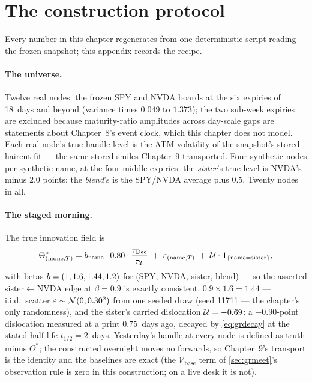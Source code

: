 \section{The construction protocol}
\label{app:grprotocol}

Every number in this chapter regenerates from one deterministic script
reading the frozen snapshot; this appendix records the recipe.

\paragraph{The universe.}
Twelve real nodes: the frozen SPY and NVDA boards at the six expiries
of 18~days and beyond (variance times $0.049$ to $1.373$); the two
sub-week expiries are excluded because maturity-ratio amplitudes
across day-scale gaps are statements about Chapter~8's event clock,
which this chapter does not model.  Each real node's true handle level
is the ATM volatility of the snapshot's stored haircut fit --- the
same stored smiles Chapter~9 transported.  Four synthetic nodes per
synthetic name, at the four middle expiries: the \emph{sister}'s true
level is NVDA's minus $2.0$ points; the \emph{blend}'s is the
SPY/NVDA average plus $0.5$.  Twenty nodes in all.

\paragraph{The staged morning.}
The true innovation field is
\[
\Theta^{*}_{(\text{name},T)}
=b_{\text{name}}\cdot
0.80\cdot\frac{\tau_{\text{Dec}}}{\tau_T}
\;+\;\varepsilon_{(\text{name},T)}
\;+\;\mathcal{U}\cdot\mathbf{1}_{\{\text{name}=\text{sister}\}},
\]
with betas $b=(1,1.6,1.44,1.2)$
for (SPY, NVDA, sister, blend) --- so the asserted
sister${\leftarrow}$NVDA edge at $\beta=0.9$ is exactly consistent,
$0.9\times1.6=1.44$ --- i.i.d.\ scatter
$\varepsilon\sim\mathcal{N}(0,0.30^{2})$ from one seeded
draw (seed 11711 --- the chapter's only randomness), and the sister's
carried dislocation $\mathcal{U}=-0.69$: a $-0.90$-point
dislocation measured at a print $0.75$~days ago, decayed by
\cref{eq:grdecay} at the stated half-life $t_{1/2}=2$~days.
Yesterday's handle at every node is defined as truth minus
$\Theta^{*}$; the constructed overnight moves no forwards, so
Chapter~9's transport is the identity and the baselines are exact
(the $\mathcal{V}_{\mathrm{base}}$ term of
\cref{sec:grmeet}'s observation rule is zero in this construction; on
a live desk it is not).

